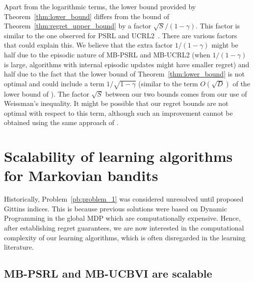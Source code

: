 Apart from the logarithmic terms, the lower bound provided by Theorem~\ref{thm:lower_bound} differs from the bound of Theorem~\ref{thm:regret_upper_bound} by a factor $\sqrt{S}/(1-\gamma)$. This factor is similar to the one observed for PSRL and UCRL2~\cite{osband2013more,jaksch2010near}. There are various factors that could explain this. We believe that the extra factor  $1/(1-\gamma)$ might be half due to the episodic nature of MB-PSRL and MB-UCRL2 (when $1/(1-\gamma)$ is large, algorithms with internal episodic updates might have smaller regret) and half due to the fact that the lower bound of Theorem~\ref{thm:lower_bound} is not optimal and could include a term $1/\sqrt{1-\gamma}$ (similar to the term $O(\sqrt{D})$ of the lower bound of \cite{osband2016lower,jaksch2010near}). The factor $\sqrt{S}$ between our two bounds comes from our use of Weissman's inequality. It might be possible that our regret bounds  are not optimal with respect to this term, although such an improvement cannot be obtained using the same approach of \cite{azar2017minimax}.

\section{Scalability of learning algorithms for Markovian bandits}
\label{ch:rested:scale}

Historically, Problem~{\ref{pb:problem_1}} was considered unresolved until \cite{gittins1979bandit} proposed Gittins indices. This is because previous solutions were based on Dynamic Programming in the global MDP which are computationally expensive. Hence, after establishing regret guarantees, we are now interested in the computational complexity of our learning algorithms, which is often disregarded in the learning literature.

\subsection{MB-PSRL and MB-UCBVI are scalable}

